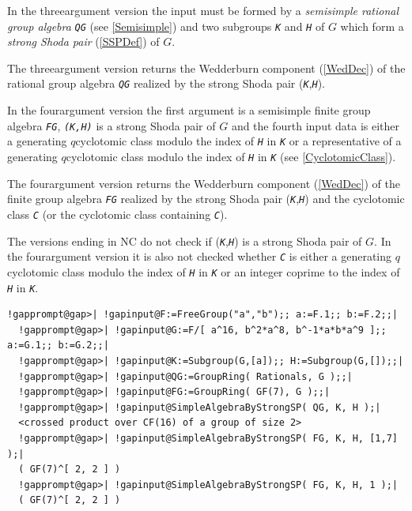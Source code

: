 \documentclass[a4paper,11pt]{report}
\begin{document}
{{{ In the three\texttt{}argument version the input must be formed by a \emph{semisimple rational group algebra} \mbox{\texttt{\mdseries\slshape QG}} (see \ref{Semisimple}) and two subgroups \mbox{\texttt{\mdseries\slshape K}} and \mbox{\texttt{\mdseries\slshape H}} of $G$ which form a \emph{strong Shoda pair} (\ref{SSPDef}) of $G$. 

 The three\texttt{}argument version returns the Wedderburn component
(\ref{WedDec}) of the rational group algebra \mbox{\texttt{\mdseries\slshape QG}} realized by the strong Shoda pair (\mbox{\texttt{\mdseries\slshape K}},\mbox{\texttt{\mdseries\slshape H}}). 

 In the four\texttt{}argument version the first argument is a
semisimple finite group algebra \mbox{\texttt{\mdseries\slshape FG}}, \mbox{\texttt{\mdseries\slshape (K,H)}} is a strong Shoda pair of $G$ and the fourth input data is either a generating $q$\texttt{}cyclotomic class modulo the index of \mbox{\texttt{\mdseries\slshape H}} in \mbox{\texttt{\mdseries\slshape K}} or a representative of a generating $q$\texttt{}cyclotomic class modulo the index of \mbox{\texttt{\mdseries\slshape H}} in \mbox{\texttt{\mdseries\slshape K}} (see \ref{CyclotomicClass}). 

 The four\texttt{}argument version returns the Wedderburn component
(\ref{WedDec}) of the finite group algebra \mbox{\texttt{\mdseries\slshape FG}} realized by the strong Shoda pair (\mbox{\texttt{\mdseries\slshape K}},\mbox{\texttt{\mdseries\slshape H}}) and the cyclotomic class \mbox{\texttt{\mdseries\slshape C}} (or the cyclotomic class containing \mbox{\texttt{\mdseries\slshape C}}). 

 The versions ending in NC do not check if (\mbox{\texttt{\mdseries\slshape K}},\mbox{\texttt{\mdseries\slshape H}}) is a strong Shoda pair of $G$. In the four\texttt{}argument version it is also not checked
whether \mbox{\texttt{\mdseries\slshape C}} is either a generating $q$\texttt{}cyclotomic class modulo the index of \mbox{\texttt{\mdseries\slshape H}} in \mbox{\texttt{\mdseries\slshape K}} or an integer coprime to the index of \mbox{\texttt{\mdseries\slshape H}} in \mbox{\texttt{\mdseries\slshape K}}. 
\begin{Verbatim}[commandchars=!@|,fontsize=\small,frame=single,label=Example]
  !gapprompt@gap>| !gapinput@F:=FreeGroup("a","b");; a:=F.1;; b:=F.2;;|
  !gapprompt@gap>| !gapinput@G:=F/[ a^16, b^2*a^8, b^-1*a*b*a^9 ];; a:=G.1;; b:=G.2;;|
  !gapprompt@gap>| !gapinput@K:=Subgroup(G,[a]);; H:=Subgroup(G,[]);;|
  !gapprompt@gap>| !gapinput@QG:=GroupRing( Rationals, G );;|
  !gapprompt@gap>| !gapinput@FG:=GroupRing( GF(7), G );;|
  !gapprompt@gap>| !gapinput@SimpleAlgebraByStrongSP( QG, K, H );|
  <crossed product over CF(16) of a group of size 2>
  !gapprompt@gap>| !gapinput@SimpleAlgebraByStrongSP( FG, K, H, [1,7] );|
  ( GF(7)^[ 2, 2 ] )
  !gapprompt@gap>| !gapinput@SimpleAlgebraByStrongSP( FG, K, H, 1 );|
  ( GF(7)^[ 2, 2 ] )
\end{Verbatim}
 }

}}
\end{document}
